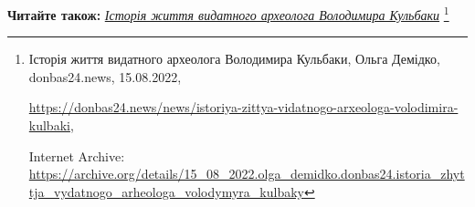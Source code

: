  
 
 
 
 

\textbf{Читайте також:} \href{https://archive.org/details/15_08_2022.olga_demidko.donbas24.istoria_zhyttja_vydatnogo_arheologa_volodymyra_kulbaky}{\emph{Історія життя видатного археолога Володимира Кульбаки}}%
\footnote{Історія життя видатного археолога Володимира Кульбаки, Ольга Демідко, donbas24.news, 15.08.2022, \par%
\url{https://donbas24.news/news/istoriya-zittya-vidatnogo-arxeologa-volodimira-kulbaki}, \par%
Internet Archive: \url{https://archive.org/details/15_08_2022.olga_demidko.donbas24.istoria_zhyttja_vydatnogo_arheologa_volodymyra_kulbaky}%
}
